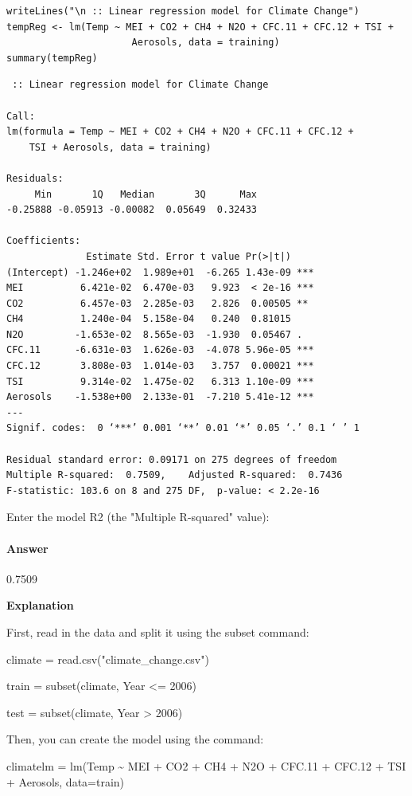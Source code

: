 \documentclass[letterpaper, 9pt, onecolumn, twoside, technote, final]{IEEEtran}
\begin{document}
\begin{verbatim}
writeLines("\n :: Linear regression model for Climate Change")
tempReg <- lm(Temp ~ MEI + CO2 + CH4 + N2O + CFC.11 + CFC.12 + TSI +
                      Aerosols, data = training)
summary(tempReg)
\end{verbatim}

\begin{verbatim}
 :: Linear regression model for Climate Change

Call:
lm(formula = Temp ~ MEI + CO2 + CH4 + N2O + CFC.11 + CFC.12 +
    TSI + Aerosols, data = training)

Residuals:
     Min       1Q   Median       3Q      Max
-0.25888 -0.05913 -0.00082  0.05649  0.32433

Coefficients:
              Estimate Std. Error t value Pr(>|t|)
(Intercept) -1.246e+02  1.989e+01  -6.265 1.43e-09 ***
MEI          6.421e-02  6.470e-03   9.923  < 2e-16 ***
CO2          6.457e-03  2.285e-03   2.826  0.00505 **
CH4          1.240e-04  5.158e-04   0.240  0.81015
N2O         -1.653e-02  8.565e-03  -1.930  0.05467 .
CFC.11      -6.631e-03  1.626e-03  -4.078 5.96e-05 ***
CFC.12       3.808e-03  1.014e-03   3.757  0.00021 ***
TSI          9.314e-02  1.475e-02   6.313 1.10e-09 ***
Aerosols    -1.538e+00  2.133e-01  -7.210 5.41e-12 ***
---
Signif. codes:  0 ‘***’ 0.001 ‘**’ 0.01 ‘*’ 0.05 ‘.’ 0.1 ‘ ’ 1

Residual standard error: 0.09171 on 275 degrees of freedom
Multiple R-squared:  0.7509,	Adjusted R-squared:  0.7436
F-statistic: 103.6 on 8 and 275 DF,  p-value: < 2.2e-16
\end{verbatim}

Enter the model R2 (the "Multiple R-squared" value):

\paragraph{Answer}
\label{sec-1-1-3-1}

0.7509

\textbf{Explanation}

First, read in the data and split it using the subset command:

climate = read.csv("climate\_change.csv")

train = subset(climate, Year <= 2006)

test = subset(climate, Year > 2006)

Then, you can create the model using the command:

climatelm = lm(Temp \textasciitilde{} MEI + CO2 + CH4 + N2O + CFC.11 + CFC.12 + TSI +
Aerosols, data=train)
\end{document}
